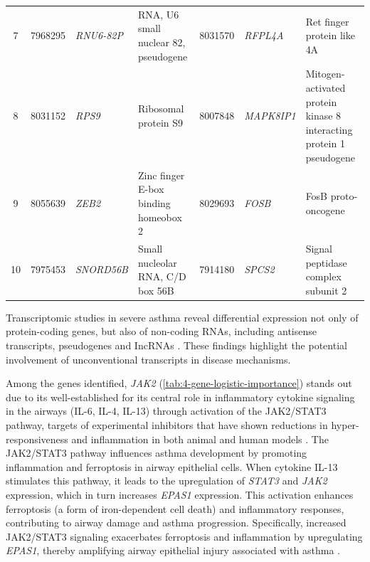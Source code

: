 \begin{table}[htbp]
\begin{tabular}{cclp{4cm}clp{4cm}}
    7  & 7968295                                & \textit{RNU6-82P}                      & RNA, U6 small nuclear 82, pseudogene              & 8031570          & \textit{RFPL4A}    & Ret finger protein like 4A                                          \\
    8  & 8031152                                & \textit{RPS9}                          & Ribosomal protein S9                              & 8007848          & \textit{MAPK8IP1}  & Mitogen-activated protein kinase 8 interacting protein 1 pseudogene \\
    9  & 8055639                                & \textit{ZEB2}                          & Zinc finger E-box binding homeobox 2              & 8029693          & \textit{FOSB}      & FosB proto-oncogene                                                 \\
    10 & 7975453                                & \textit{SNORD56B}                      & Small nucleolar RNA, C/D box 56B                  & 7914180          & \textit{SPCS2}     & Signal peptidase complex subunit 2                                  \\
    \hline
  \end{tabular}
\end{table} %

Transcriptomic studies in severe asthma reveal differential expression not only of protein-coding genes, but also of non-coding RNAs, including antisense transcripts, pseudogenes and IncRNAs %
\cite{jurkiewicz_integrated_2021}. These findings highlight the potential involvement of unconventional transcripts in disease mechanisms.

Among the genes identified, \textit{JAK2} (\autoref{tab:4-gene-logistic-importance}) stands out due to its well-established for its central role in inflammatory cytokine signaling in the airways (IL-6, IL-4, IL-13) through activation of the JAK2/STAT3 pathway, targets of experimental inhibitors that have shown reductions in hyper-responsiveness and inflammation in both animal and human models %
\cite{ren_zhike_2021}. The JAK2/STAT3 pathway influences asthma development by promoting inflammation and ferroptosis in airway epithelial cells. When cytokine IL-13 stimulates this pathway, it leads to the upregulation of \textit{STAT3} and \textit{JAK2} expression, which in turn increases \textit{EPAS1} expression. This activation enhances ferroptosis (a form of iron-dependent cell death) and inflammatory responses, contributing to airway damage and asthma progression. Specifically, increased JAK2/STAT3 signaling exacerbates ferroptosis and inflammation by upregulating \textit{EPAS1}, thereby amplifying airway epithelial injury associated with asthma %
\cite{liu_epas1_2025}.

